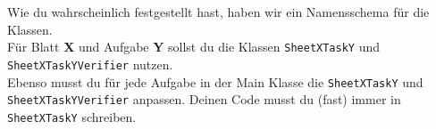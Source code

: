 


\label{ex1}


\begin{Infobox}
    Wie du wahrscheinlich festgestellt hast, haben wir ein Namensschema für die Klassen.\\
    Für Blatt \textbf{X} und Aufgabe \textbf{Y} sollst du die Klassen \lstinline{SheetXTaskY} und \lstinline{SheetXTaskYVerifier} nutzen.\\
    Ebenso musst du für jede Aufgabe in der Main Klasse die \lstinline{SheetXTaskY} und \lstinline{SheetXTaskYVerifier} anpassen.
    Deinen Code musst du (fast) immer in \lstinline{SheetXTaskY} schreiben.
\end{Infobox}

